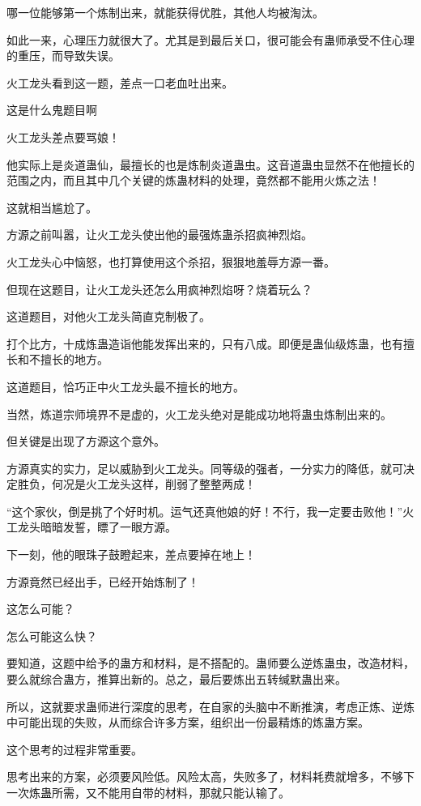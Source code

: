 \begin{this_body}
哪一位能够第一个炼制出来，就能获得优胜，其他人均被淘汰。

如此一来，心理压力就很大了。尤其是到最后关口，很可能会有蛊师承受不住心理的重压，而导致失误。

火工龙头看到这一题，差点一口老血吐出来。

这是什么鬼题目啊

火工龙头差点要骂娘！

他实际上是炎道蛊仙，最擅长的也是炼制炎道蛊虫。这音道蛊虫显然不在他擅长的范围之内，而且其中几个关键的炼蛊材料的处理，竟然都不能用火炼之法！

这就相当尴尬了。

方源之前叫嚣，让火工龙头使出他的最强炼蛊杀招疯神烈焰。

火工龙头心中恼怒，也打算使用这个杀招，狠狠地羞辱方源一番。

但现在这题目，让火工龙头还怎么用疯神烈焰呀？烧着玩么？

这道题目，对他火工龙头简直克制极了。

打个比方，十成炼蛊造诣他能发挥出来的，只有八成。即便是蛊仙级炼蛊，也有擅长和不擅长的地方。

这道题目，恰巧正中火工龙头最不擅长的地方。

当然，炼道宗师境界不是虚的，火工龙头绝对是能成功地将蛊虫炼制出来的。

但关键是出现了方源这个意外。

方源真实的实力，足以威胁到火工龙头。同等级的强者，一分实力的降低，就可决定胜负，何况是火工龙头这样，削弱了整整两成！

“这个家伙，倒是挑了个好时机。运气还真他娘的好！不行，我一定要击败他！”火工龙头暗暗发誓，瞟了一眼方源。

下一刻，他的眼珠子鼓瞪起来，差点要掉在地上！

方源竟然已经出手，已经开始炼制了！

这怎么可能？

怎么可能这么快？

要知道，这题中给予的蛊方和材料，是不搭配的。蛊师要么逆炼蛊虫，改造材料，要么就综合蛊方，推算出新的。总之，最后要炼出五转缄默蛊出来。

所以，这就要求蛊师进行深度的思考，在自家的头脑中不断推演，考虑正炼、逆炼中可能出现的失败，从而综合许多方案，组织出一份最精炼的炼蛊方案。

这个思考的过程非常重要。

思考出来的方案，必须要风险低。风险太高，失败多了，材料耗费就增多，不够下一次炼蛊所需，又不能用自带的材料，那就只能认输了。


\end{this_body}
